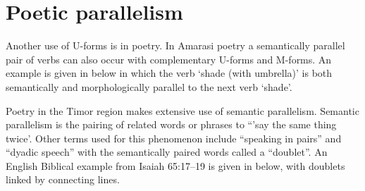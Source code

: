 \section{Poetic parallelism}\label{sec:PoePar}
Another use of U-forms is in poetry.
In Amarasi poetry a semantically parallel pair of verbs
can also occur with complementary U-forms and M-forms.
An example is given in  below
in which the verb  `shade (with umbrella)'
is both semantically and morphologically parallel
to the next verb  `shade'.

\begin{exe}
	\label{ex:130825-3, 1.21}
\end{exe}

Poetry in the Timor region makes extensive use of semantic parallelism.
Semantic parallelism is the pairing of related words or phrases to ``'say the same thing twice'.
Other terms used for this phenomenon include ``speaking in pairs''
and ``dyadic speech'' with the semantically paired words called a ``doublet''.
An English Biblical example from Isaiah 65:17--19 is given in
 below, with doublets linked by connecting lines.

